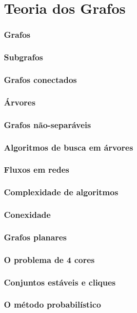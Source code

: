 \part{Teoria dos Grafos}
\section{Grafos}
\section{Subgrafos}
\section{Grafos conectados}
\section{Árvores}
\section{Grafos não-separáveis}
\section{Algoritmos de busca em árvores}
\section{Fluxos em redes}
\section{Complexidade de algoritmos}
\section{Conexidade}
\section{Grafos planares}
\section{O problema de 4 cores}
\section{Conjuntos estáveis e cliques}
\section{O método probabilístico}
